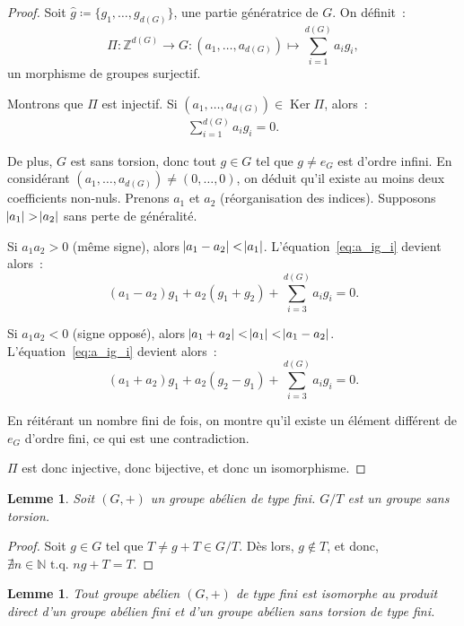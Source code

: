 \documentclass{article}
\newtheorem{lem}[thm]{Lemme}
\theoremstyle{definition}
\theoremstyle{remark}
\DeclareMathOperator{\Ker}{Ker}
\newcommand{\Z}{\mathbb Z}
\newcommand{\N}{\mathbb N}
\newcommand{\tq}{\text{ t.q. }}
\begin{document}
		\begin{proof} Soit $\hat g \coloneqq \{g_1, \ldots, g_{d(G)}\}$, une partie génératrice de $G$. On définit~:
		\[\Pi : \Z^{d(G)} \to G : (a_1, \ldots, a_{d(G)}) \mapsto \sum_{i=1}^{d(G)}a_ig_i,\]
		un morphisme de groupes surjectif.

		Montrons que $\Pi$ est injectif. Si $(a_1, \ldots, a_{d(G)}) \in \Ker \Pi$, alors~:
		\begin{align}\label{eq:a_ig_i}
			\sum_{i=1}^{d(G)}a_ig_i = 0.
		\end{align}

		De plus, $G$ est sans torsion, donc tout $g \in G$ tel que $g \neq e_G$ est d'ordre infini. En considérant $(a_1, \ldots, a_{d(G)}) \neq (0, \ldots, 0)$,
		on déduit qu'il existe au moins deux coefficients non-nuls. Prenons $a_1$ et $a_2$ (réorganisation des indices). Supposons $\abs {a_1} > \abs {a_2}$
		sans perte de généralité.

		Si $a_1a_2 > 0$ (même signe), alors $\abs {a_1-a_2} < \abs {a_1}$. L'équation~\eqref{eq:a_ig_i} devient alors~:
		\[(a_1-a_2)g_1 + a_2(g_1+g_2) + \sum_{i=3}^{d(G)}a_ig_i = 0.\]

		Si $a_1a_2 < 0$ (signe opposé), alors $\abs {a_1+a_2} < \abs {a_1} < \abs {a_1-a_2}$. L'équation~\eqref{eq:a_ig_i} devient alors~:
		\[(a_1+a_2)g_1 + a_2(g_2-g_1) + \sum_{i=3}^{d(G)}a_ig_i = 0.\]

		En réitérant un nombre fini de fois, on montre qu'il existe un élément différent de $e_G$ d'ordre fini, ce qui est une contradiction.

		$\Pi$ est donc injective, donc bijective, et donc un isomorphisme.
		\end{proof}

		\begin{lem} Soit $(G, +)$ un groupe abélien de type fini. $G/T$ est un groupe sans torsion.
		\end{lem}

		\begin{proof} Soit $g \in G$ tel que $T \neq g+T \in G/T$. Dès lors, $g \not \in T$, et donc, $\nexists n \in \N \tq ng+T = T$.
		\end{proof}

		\begin{lem} Tout groupe abélien $(G, +)$ de type fini est isomorphe au produit direct d'un groupe abélien fini et d'un groupe abélien sans torsion de
		type fini.
		\end{lem}
\end{document}
